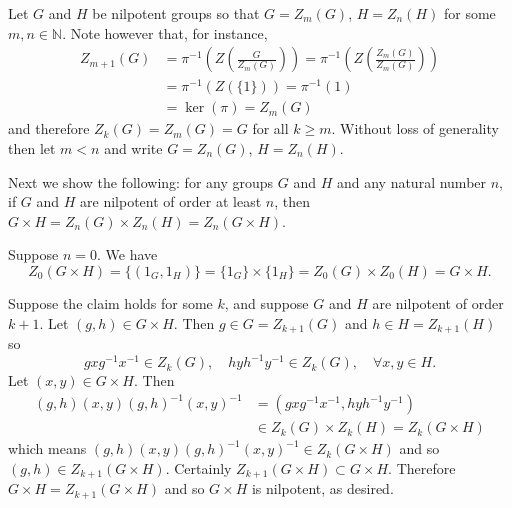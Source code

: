 \documentclass{article}
\begin{document}
\begin{Answer}
\begin{enumerate}[(a)]
{\begin{itemize}
{        Let $G$ and $H$ be nilpotent groups so that $G = Z_m(G)$,
        $H = Z_n(H)$ for some $m, n \in \mathbb{N}$. Note however
        that, for instance,
        \begin{align*}
          Z_{m+1}(G)
       &= \pi^{-1}\left(Z\left(\frac{G}{Z_{m}(G)}\right)\right)
        = \pi^{-1}\left(Z\left(\frac{Z_m(G)}{Z_m(G)}\right)\right) \\
       &= \pi^{-1}\left(Z(\{ 1 \})\right)
        = \pi^{-1}(1) \\
       &= \ker(\pi)
        = Z_{m}(G)
        \end{align*}
        and therefore $Z_k(G) = Z_m(G) = G$ for all $k \geq m$.
        Without loss of generality then let $m < n$ and write
        $G = Z_n(G)$, $H = Z_n(H)$.

        Next we show the following: for any groups $G$ and $H$ and
        any natural number $n$, if $G$ and $H$ are nilpotent of order
        at least $n$, then
        $G \times H = Z_n(G) \times Z_n(H) = Z_n(G \times H)$.

        Suppose $n = 0$. We have
        $$
          Z_0(G \times H)
        = \{ (1_G, 1_H) \}
        = \{ 1_G \} \times \{ 1_H \}
        = Z_0(G) \times Z_0(H)
        = G \times H.
        $$

        Suppose the claim holds for some $k$, and suppose
        $G$ and $H$ are nilpotent of order $k+1$.
        Let $(g, h) \in G \times H$.
        Then $g \in G = Z_{k+1}(G)$
        and $h \in H = Z_{k+1}(H)$ so
        $$
        g x g^{-1} x^{-1} \in Z_{k}(G), \quad
        h y h^{-1} y^{-1} \in Z_{k}(G), \quad
        \forall x, y \in H.
        $$
        Let $(x, y) \in G \times H$. Then
        \begin{align*}
             (g, h) (x, y) (g, h)^{-1} (x, y)^{-1}
         &=  (g x g^{-1} x^{-1}, h y h^{-1} y^{-1}) \\
        &\in Z_k(G) \times Z_k(H) = Z_k(G \times H)
        \end{align*}
        which means
        $(g, h)(x, y)(g, h)^{-1}(x, y)^{-1} \in Z_k(G \times H)$ and
        so $(g, h) \in Z_{k+1}(G \times H)$. Certainly
        $Z_{k+1}(G \times H) \subset G \times H$. Therefore
        $G \times H = Z_{k+1}(G \times H)$ and so $G \times H$ is
        nilpotent, as desired.
      }
    \end{itemize}
  }
\end{enumerate}
\end{Answer}

\pagebreak
\end{document}
